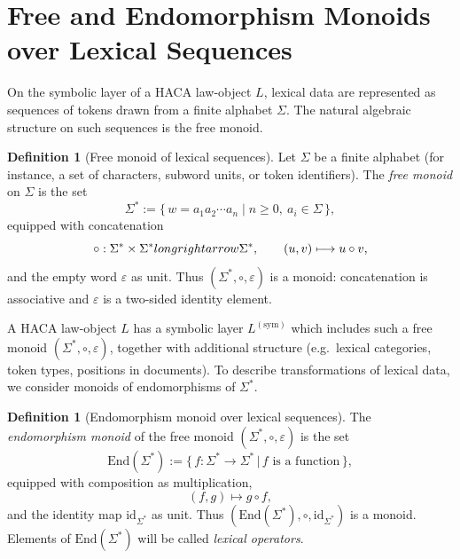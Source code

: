 \documentclass[11pt]{book}
\theoremstyle{plain}
\theoremstyle{definition}
\newtheorem{definition}[theorem]{Definition}
\theoremstyle{remark}
\begin{document}
\section[Free and Endomorphism Monoids over Lexical Sequences]{Free and Endomorphism Monoids over Lexical Sequences}


On the symbolic layer of a HACA law-object $L$, lexical data are
represented as sequences of tokens drawn from a finite alphabet
$\Sigma$. The natural algebraic structure on such sequences is the
free monoid.

\begin{definition}[Free monoid of lexical sequences]
\label{def:free-monoid-lexical}
Let $\Sigma$ be a finite alphabet (for instance, a set of characters,
subword units, or token identifiers). The \emph{free monoid} on
$\Sigma$ is the set
\[
  \Sigma^*
  :=
  \{\, w = a_1 a_2\cdots a_n \mid n\ge 0,\ a_i\in\Sigma \,\},
\]
equipped with concatenation
\[
  \circ : \Sigma^*\times\Sigma^*\\longrightarrow\Sigma^*,
  \qquad
  (u,v)\longmapsto u\circ v,
\]
and the empty word $\varepsilon$ as unit. Thus $(\Sigma^*,\circ,
\varepsilon)$ is a monoid: concatenation is associative and
$\varepsilon$ is a two-sided identity element.
\end{definition}

A HACA law-object $L$ has a symbolic layer $L^{(\mathrm{sym})}$ which
includes such a free monoid $(\Sigma^*,\circ,\varepsilon)$, together
with additional structure (e.g.\ lexical categories, token types,
positions in documents). To describe transformations of lexical data,
we consider monoids of endomorphisms of $\Sigma^*$.

\begin{definition}[Endomorphism monoid over lexical sequences]
\label{def:endomorphism-monoid}
The \emph{endomorphism monoid} of the free monoid $(\Sigma^*,\circ,
\varepsilon)$ is the set
\[
  \mathrm{End}(\Sigma^*)
  :=
  \{\, f:\Sigma^*\to\Sigma^* \,\big|\, f \text{ is a function} \,\},
\]
equipped with composition as multiplication,
\[
  (f,g)\longmapsto g\circ f,
\]
and the identity map $\mathrm{id}_{\Sigma^*}$ as unit. Thus
$(\mathrm{End}(\Sigma^*),\circ,\mathrm{id}_{\Sigma^*})$ is a monoid.
Elements of $\mathrm{End}(\Sigma^*)$ will be called \emph{lexical
operators}.
\end{definition}
\end{document}
